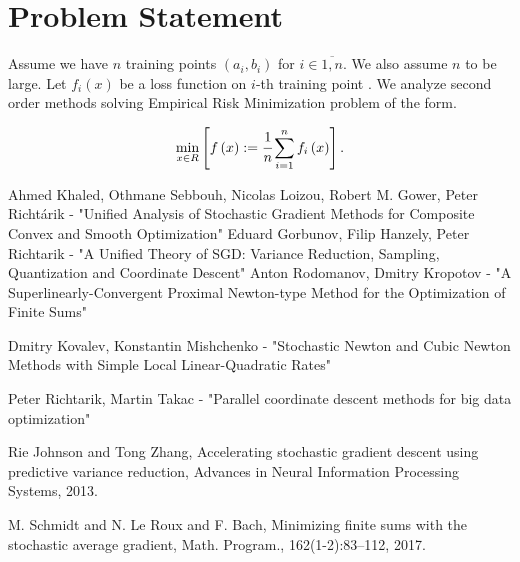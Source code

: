 \documentclass{article}
\begin{document}
\section{Problem Statement}

Assume we have $n$ training points $\left(a_i, b_i\right)$ for $i \in \overline{1, n}$. We also assume $n$ to be large. Let $f_i\left(x\right)$ be a loss function on $i$-th training point . We analyze second order methods solving Empirical Risk Minimization problem of the form.

\begin{equation}
    \min\limits_{x\in R} \left[f\left(x\right):=\cfrac{1}{n}\sum\limits_{i=1}^{n}f_i\left(x\right)\right].
\end{equation}

\newpage
 
 
\begin{thebibliography}{}
     Ahmed Khaled, Othmane Sebbouh, Nicolas Loizou, Robert M. Gower, Peter Richtárik - "Unified Analysis of Stochastic Gradient Methods for Composite Convex and Smooth Optimization"
     Eduard Gorbunov, Filip Hanzely, Peter Richtarik  -  "A Unified Theory of SGD: Variance Reduction, Sampling, Quantization and Coordinate Descent"
     Anton Rodomanov, Dmitry Kropotov - "A Superlinearly-Convergent Proximal Newton-type Method for the Optimization of Finite Sums"
    
     Dmitry Kovalev, Konstantin Mishchenko - "Stochastic Newton and Cubic Newton Methods with Simple Local Linear-Quadratic Rates"
    
    Peter Richtarik, Martin Takac - "Parallel coordinate descent methods for big data optimization"

    
 Rie Johnson and Tong Zhang, Accelerating stochastic gradient descent using predictive variance reduction, Advances in Neural Information Processing Systems, 2013.
 
    M. Schmidt and N. Le Roux and F. Bach, Minimizing finite sums with the stochastic average
gradient, Math. Program., 162(1-2):83–112, 2017.
\end{thebibliography}
\end{document}
